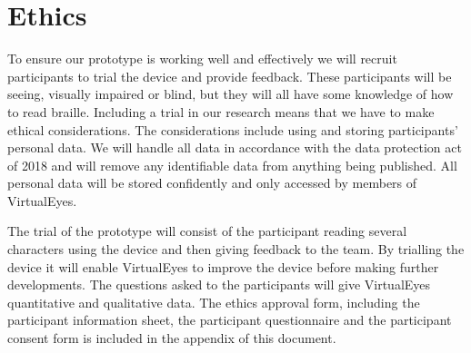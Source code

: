 \section{Ethics}
To ensure our prototype is working well and effectively we will recruit participants to trial the device and provide feedback. These participants will be seeing, visually impaired or blind, but they will all have some knowledge of how to read braille. Including a trial in our research means that we have to make ethical considerations. The considerations include using and storing participants' personal data. We will handle all data in accordance with the data protection act of 2018 and will remove any identifiable data from anything being published. All personal data will be stored confidently and only accessed by members of VirtualEyes. 

The trial of the prototype will consist of the participant reading several characters using the device and then giving feedback to the team. By trialling the device it will enable VirtualEyes to improve the device before making further developments. The questions asked to the participants will give VirtualEyes quantitative and qualitative data. The ethics approval form, including the participant information sheet, the participant questionnaire  and the participant consent form is included in the appendix of this document. 
